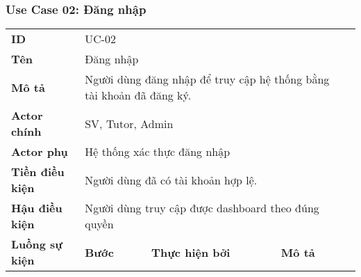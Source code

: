 \subsubsection*{Use Case 02: Đăng nhập}
\begin{samepage}
\begin{table}[h!]
\begin{tabular}{|l|lll|l}
\cline{1-4}
\textbf{ID}                              & \multicolumn{3}{l|}{UC-02}                                                                                                                                                                                    &  \\ \cline{1-4}
\textbf{Tên}                             & \multicolumn{3}{l|}{Đăng nhập}                                                                                                                                                                                &  \\ \cline{1-4}
\textbf{Mô tả}                           & \multicolumn{3}{l|}{Người dùng đăng nhập để truy cập hệ thống bằng tài khoản đã đăng ký.}                                                                                                                     &  \\ \cline{1-4}
\textbf{Actor chính}                     & \multicolumn{3}{l|}{SV, Tutor, Admin}                                                                                                                                                                         &  \\ \cline{1-4}
\textbf{Actor phụ}                       & \multicolumn{3}{l|}{Hệ thống xác thực đăng nhập}                                                                                                                                                              &  \\ \cline{1-4}
\textbf{Tiền điều kiện}                  & \multicolumn{3}{l|}{Người dùng đã có tài khoản hợp lệ.}                                                                                                                                                       &  \\ \cline{1-4}
\textbf{Hậu điều kiện}                   & \multicolumn{3}{l|}{Người dùng truy cập được dashboard theo đúng quyền}                                                                                                                                       &  \\ \cline{1-4}
\multirow{6}{*}{\textbf{Luồng sự kiện}}  & \multicolumn{1}{l|}{\textbf{Bước}} & \multicolumn{1}{l|}{\textbf{Thực hiện bởi}} & \textbf{Mô tả}                                                                                                             &  \\ \cline{2-4}

\end{tabular}
\end{table}
\end{samepage}
